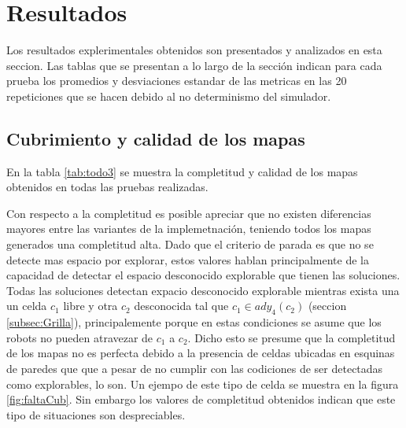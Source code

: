 \section{Resultados}
\newlength{\graphlen}
\setlength{\graphlen}{0.75\textwidth}


Los resultados explerimentales obtenidos son presentados y analizados en esta
seccion. Las tablas que se presentan a lo largo de la sección indican para cada
prueba los promedios y desviaciones estandar de las metricas en las 20
repeticiones que se hacen debido al no determinismo del simulador.

\subsection{Cubrimiento y calidad de los mapas} \label{sec:exp:cubcal}



En la tabla \ref{tab:todo3} se muestra la completitud y calidad de los mapas
obtenidos en todas las pruebas realizadas. 

Con respecto a la completitud es posible apreciar que no existen diferencias
mayores entre las variantes de la implemetnación, teniendo todos los mapas
generados una completitud alta. Dado que el criterio de parada es que no se
detecte mas espacio por explorar, estos valores hablan principalmente de la
capacidad de detectar el espacio desconocido explorable que tienen las
soluciones. Todas las soluciones detectan expacio desconocido explorable
mientras exista una un celda $c_1$ libre y otra $c_2$ desconocida tal que $c_1
\in ady_4(c_2)$ (seccion \ref{subsec:Grilla}), principalemente porque en estas
condiciones se asume que los robots no pueden atravezar de $c_1$ a $c_2$. Dicho
esto se presume que la completitud de los mapas no es perfecta debido a la
presencia de celdas ubicadas en esquinas de paredes que que a pesar de no
cumplir con las codiciones de ser detectadas como explorables, lo son. Un
ejempo de este tipo de celda se muestra en la figura \ref{fig:faltaCub}. Sin
embargo los valores de completitud obtenidos indican que este tipo de
situaciones son despreciables.

